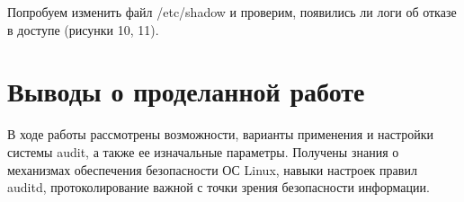 Попробуем изменить файл /etc/shadow и проверим, появились ли логи об отказе в доступе (рисунки 10, 11). 

\FloatBarrier

\FloatBarrier



\section{Выводы о проделанной работе}
В ходе работы рассмотрены возможности, варианты применения и настройки системы audit, а также ее изначальные параметры. Получены знания о механизмах обеспечения безопасности ОС Linux, навыки настроек правил auditd, протоколирование важной с точки зрения безопасности информации.
